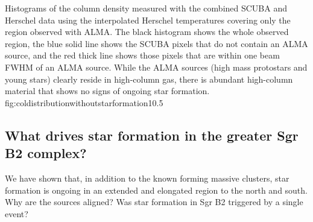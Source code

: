 \documentclass[twocolumn]{aastex61}
\begin{document}
% 





{Histograms of the column density measured with the combined SCUBA and Herschel
data using the interpolated Herschel temperatures covering only the region
observed with ALMA.  The black histogram shows the whole observed region,
the blue solid line shows the SCUBA pixels that do not contain an ALMA source,
and the red thick line shows those pixels that are within one beam
FWHM of an ALMA source.  While the ALMA sources (high mass protostars and young
stars)
clearly reside in high-column gas, there is abundant high-column material
that shows no signs of ongoing star formation.}
{fig:coldistributionwithoutstarformation}{1}{0.5\textwidth}

\subsection{What drives star formation in the greater Sgr B2 complex?}
\label{sec:whatdrives}
We have shown that, in addition to the known forming massive clusters,
star formation is ongoing in an extended and elongated region to the north
and south.  Why are the sources aligned?  Was star formation in Sgr B2
triggered by a single event?
\end{document}
